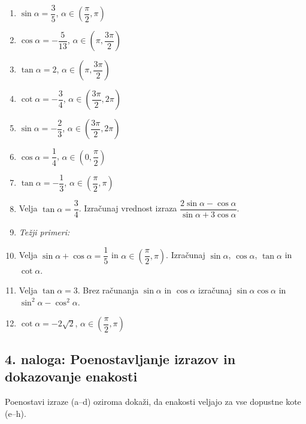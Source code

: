 \documentclass[11pt,a4paper]{article}
\newcommand{\naloga}[1]{\subsection*{#1}}
\begin{document}
\begin{enumerate}[label=\alph*), itemsep=8pt]
  \item $\sin\alpha = \dfrac{3}{5}$, \quad $\alpha \in \left(\dfrac{\pi}{2}, \pi\right)$
  \item $\cos\alpha = -\dfrac{5}{13}$, \quad $\alpha \in \left(\pi, \dfrac{3\pi}{2}\right)$
  \item $\tan\alpha = 2$, \quad $\alpha \in \left(\pi, \dfrac{3\pi}{2}\right)$
  \item $\cot\alpha = -\dfrac{3}{4}$, \quad $\alpha \in \left(\dfrac{3\pi}{2}, 2\pi\right)$
  \item $\sin\alpha = -\dfrac{2}{3}$, \quad $\alpha \in \left(\dfrac{3\pi}{2}, 2\pi\right)$
  \item $\cos\alpha = \dfrac{1}{4}$, \quad $\alpha \in \left(0, \dfrac{\pi}{2}\right)$
  \item $\tan\alpha = -\dfrac{1}{3}$, \quad $\alpha \in \left(\dfrac{\pi}{2}, \pi\right)$
  \item Velja $\tan\alpha = \dfrac{3}{4}$. Izračunaj vrednost izraza
        $\dfrac{2\sin\alpha - \cos\alpha}{\sin\alpha + 3\cos\alpha}$.
  \item[] \textit{Težji primeri:}
  \item Velja $\sin\alpha + \cos\alpha = \dfrac{1}{5}$ in $\alpha \in \left(\dfrac{\pi}{2}, \pi\right)$.
        Izračunaj $\sin\alpha$, $\cos\alpha$, $\tan\alpha$ in $\cot\alpha$.
  \item Velja $\tan\alpha = 3$. Brez računanja $\sin\alpha$ in $\cos\alpha$ izračunaj
        $\sin\alpha\cos\alpha$ in $\sin^2\alpha - \cos^2\alpha$.
  \item $\cot\alpha = -2\sqrt{2}$, \quad $\alpha \in \left(\dfrac{\pi}{2}, \pi\right)$
\end{enumerate}

\naloga{4. naloga: Poenostavljanje izrazov in dokazovanje enakosti}

Poenostavi izraze (a--d) oziroma dokaži, da enakosti veljajo za vse dopustne kote (e--h).
\end{document}
